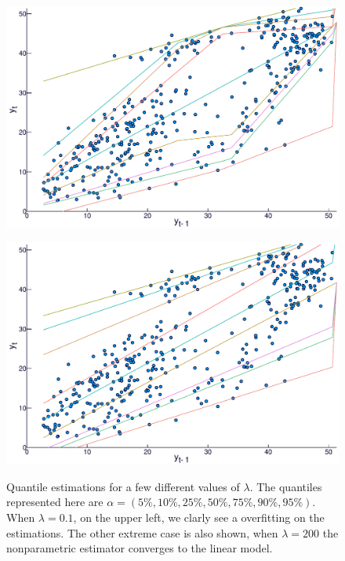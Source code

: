 \begin{figure}[htp]
\begin{minipage}[t]{0.4\linewidth}
\begin{minipage}[b]{\linewidth}
      \centering     \includegraphics[width=\textwidth]{Figuras/regressao-quantilica/icaraizinho-crossing-10}
    \end{minipage}
     \begin{minipage}[b]{\linewidth}
      \centering     \includegraphics[width=\textwidth]{Figuras/regressao-quantilica/icaraizinho-crossing-200}
      \label{fig:npqar-cross}
     \end{minipage}
  \end{minipage}
  \caption{Quantile estimations for a few different values of $\lambda$. The quantiles represented here are $\alpha = (5\%, 10\%, 25\%, 50\%, 75\%, 90\%, 95\%)$. When $\lambda = 0.1$, on the upper left, we clarly see a overfitting on the estimations. The other extreme case is also shown, when $\lambda=200$ the nonparametric estimator converges to the linear model.}
  \label{fig:npqar-results}
\end{figure}

